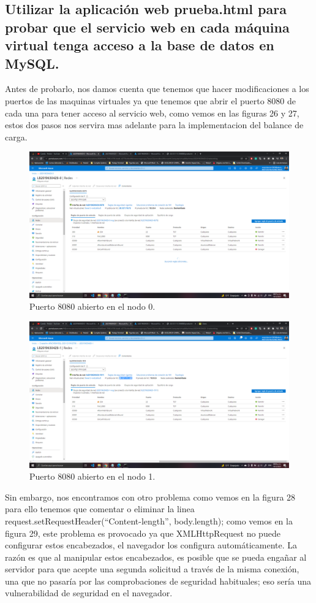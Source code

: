 \documentclass[11pt]{article}
\begin{document}
		\subsection{Utilizar la aplicación web prueba.html para probar que el servicio web en cada máquina virtual tenga acceso a la base de datos en MySQL.}	
		Antes de probarlo, nos damos cuenta que tenemos que hacer modificaciones a los puertos de las maquinas virtuales ya que tenemos que abrir el puerto 8080 de cada una para tener acceso al servicio web, como vemos en las figuras 26 y 27, estos dos pasos nos servira mas adelante para la implementacion del balance de carga.
		\begin{figure}[H]
			\centering
			\includegraphics[scale=0.34]{resources/8080N0.png}
			\caption{Puerto 8080 abierto en el nodo 0.}\label{fig:picture}
		\end{figure}
		\begin{figure}[H]
			\centering
			\includegraphics[scale=0.34]{resources/8080N1.png}
			\caption{Puerto 8080 abierto en el nodo 1.}\label{fig:picture}
		\end{figure}
		Sin embargo, nos encontramos con otro problema como vemos en la figura 28 para ello tenemos que comentar o eliminar la linea request.setRequestHeader(``Content-length'', body.length); como vemos en la figura 29, este problema es provocado ya que XMLHttpRequest no puede configurar estos encabezados, el navegador los configura automáticamente. La razón es que al manipular estos encabezados, es posible que se pueda engañar al servidor para que acepte una segunda solicitud a través de la misma conexión, una que no pasaría por las comprobaciones de seguridad habituales; eso sería una vulnerabilidad de seguridad en el navegador.
\end{document}

